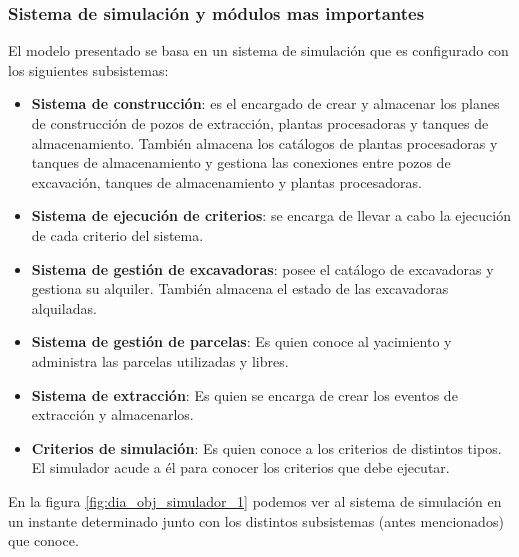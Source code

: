 \subsubsection{Sistema de simulación y módulos mas importantes}

\par El modelo presentado se basa en un sistema de simulación que es configurado con los siguientes subsistemas:
\begin{itemize}
  \item \textbf{Sistema de construcción}: es el encargado de crear y almacenar los planes de construcción de pozos de extracción, plantas procesadoras y tanques de almacenamiento. También almacena los catálogos de plantas procesadoras y tanques de almacenamiento y gestiona las conexiones entre pozos de excavación, tanques de almacenamiento y plantas procesadoras.
  \item \textbf{Sistema de ejecución de criterios}: se encarga de llevar a cabo la ejecución de cada criterio del sistema.
  \item \textbf{Sistema de gestión de excavadoras}: posee el catálogo de excavadoras y gestiona su alquiler. También almacena el estado de las excavadoras alquiladas.
  \item \textbf{Sistema de gestión de parcelas}: Es quien conoce al yacimiento y administra las parcelas utilizadas y libres.
  \item \textbf{Sistema de extracción}: Es quien se encarga de crear los eventos de extracción y almacenarlos.
  \item \textbf{Criterios de simulación}: Es quien conoce a los criterios de distintos tipos. El simulador acude a él para conocer los criterios que debe ejecutar.
\end{itemize}

\par En la figura \ref{fig:dia_obj_simulador_1} podemos ver al sistema de simulación en un instante determinado junto con los distintos subsistemas (antes mencionados) que conoce.

